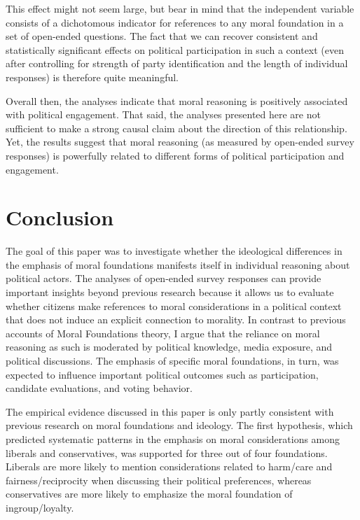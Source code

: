 \documentclass[12pt]{article}
\begin{document}
This effect might not seem large, but bear in mind that the independent variable consists of a dichotomous indicator for references to any moral foundation in a set of open-ended questions. The fact that we can recover consistent and statistically significant effects on political participation in such a context (even after controlling for strength of party identification and the length of individual responses) is therefore quite meaningful.

Overall then, the analyses indicate that moral reasoning is positively associated with political engagement. That said, the analyses presented here are not sufficient to make a strong causal claim about the direction of this relationship. Yet, the results suggest that moral reasoning (as measured by open-ended survey responses) is powerfully related to different forms of political participation and engagement.


\section{Conclusion}

The goal of this paper was to investigate whether the ideological differences in the emphasis of moral foundations manifests itself in individual reasoning about political actors. The analyses of open-ended survey responses can provide important insights beyond previous research because it allows us to evaluate whether citizens make references to moral considerations in a political context that does not induce an explicit connection to morality. In contrast to previous accounts of Moral Foundations theory, I argue that the reliance on moral reasoning as such is moderated by political knowledge, media exposure, and political discussions. The emphasis of specific moral foundations, in turn, was expected to influence important political outcomes such as participation, candidate evaluations, and voting behavior.

The empirical evidence discussed in this paper is only partly consistent with previous research on moral foundations and ideology. The first hypothesis, which predicted systematic patterns in the emphasis on moral considerations among liberals and conservatives, was supported for three out of four foundations. Liberals are more likely to mention considerations related to harm/care and fairness/reciprocity when discussing their political preferences, whereas conservatives are more likely to emphasize the moral foundation of ingroup/loyalty.
\end{document}

